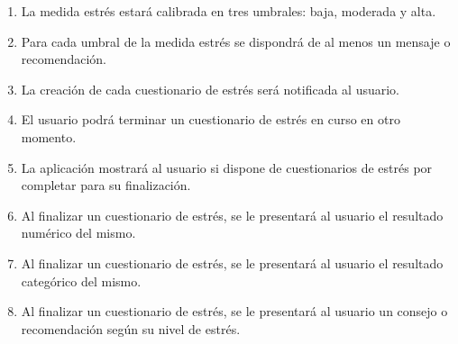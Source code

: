 \begin{enumerate}[series=req-usuario,label=\textbf{\texttt{RU-\arabic*}}]
\begin{enumerate}[series=req-funcionales,label=\textbf{\texttt{RF-\arabic*}}]
                \item \label{req:funcionales:estres_umbrales} La medida estrés estará calibrada en tres umbrales: baja, moderada y alta.
                \item \label{req:funcionales:estres_umbrales_consejo} Para cada umbral de la medida estrés se dispondrá de al menos un mensaje o recomendación.
                \item \label{req:funcionales:estres_notificacion} La creación de cada cuestionario de estrés será notificada al usuario.
                \item \label{req:funcionales:estres_cuestionario_aplazar} El usuario podrá terminar un cuestionario de estrés en curso en otro momento.
                \item \label{req:funcionales:estres_cuestionario_pendientes} La aplicación mostrará al usuario si dispone de cuestionarios de estrés por completar para su finalización.
                \item \label{req:funcionales:estres_cuestionario_numero} Al finalizar un cuestionario de estrés, se le presentará al usuario el resultado numérico del mismo.
                \item \label{req:funcionales:estres_cuestionario_categoria} Al finalizar un cuestionario de estrés, se le presentará al usuario el resultado categórico del mismo.
                \item \label{req:funcionales:estres_cuestionario_consejo} Al finalizar un cuestionario de estrés, se le presentará al usuario un consejo o recomendación según su nivel de estrés.
            \end{enumerate}
        \end{enumerate}
